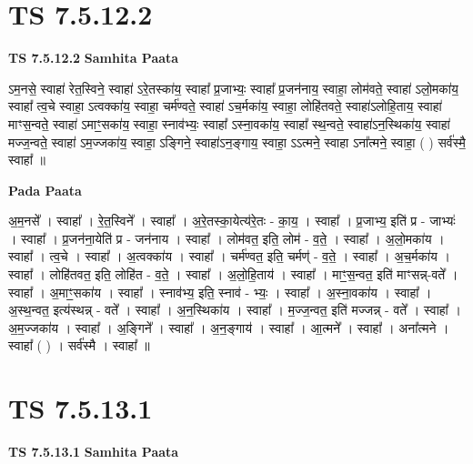 \documentclass[17pt]{extarticle}
\begin{document}
\section*{ TS 7.5.12.2 }

\textbf{TS 7.5.12.2 } \newline
\textbf{Samhita Paata} \newline

ऽम॒नसे॒ स्वाहा॑ रेत॒स्विने॒ स्वाहा॑ ऽरे॒तस्का॑य॒ स्वाहा᳚ प्र॒जाभ्यः॒ स्वाहा᳚ प्र॒जन॑नाय॒ स्वाहा॒ लोम॑वते॒ स्वाहा॑ ऽलो॒मका॑य॒ स्वाहा᳚ त्व॒चे स्वाहा॒ ऽत्वक्का॑य॒ स्वाहा॒ चर्म॑ण्वते॒ स्वाहा॑ ऽच॒र्मका॑य॒ स्वाहा॒ लोहि॑तवते॒ स्वाहा॑ऽलोहि॒ताय॒ स्वाहा॑ माꣳस॒न्वते॒ स्वाहा॑ ऽमाꣳ॒॒सका॑य॒ स्वाहा॒ स्नाव॑भ्यः॒ स्वाहा᳚ ऽस्ना॒वका॑य॒ स्वाहा᳚ स्थ॒न्वते॒ स्वाहा॑ऽन॒स्थिका॑य॒ स्वाहा॑ मज्ज॒न्वते॒ स्वाहा॑ ऽम॒ज्जका॑य॒ स्वाहा॒ ऽङ्गिने॒ स्वाहा॑ऽन॒ङ्गाय॒ स्वाहा॒ ऽऽत्मने॒ स्वाहा ऽना᳚त्मने॒ स्वाहा॒ ( ) सर्व॑स्मै॒ स्वाहा᳚ ॥ \newline

\textbf{Pada Paata} \newline

अ॒म॒नसे᳚ । स्वाहा᳚ । रे॒त॒स्विने᳚ । स्वाहा᳚ । अ॒रे॒तस्का॒येत्य॑रे॒तः - का॒य॒ । स्वाहा᳚ । प्र॒जाभ्य॒ इति॑ प्र - जाभ्यः॑ । स्वाहा᳚ । प्र॒जन॑ना॒येति॑ प्र - जन॑नाय । स्वाहा᳚ । लोम॑वत॒ इति॒ लोम॑ - व॒ते॒ । स्वाहा᳚ । अ॒लो॒मका॑य । स्वाहा᳚ । त्व॒चे । स्वाहा᳚ । अ॒त्वक्का॑य । स्वाहा᳚ । चर्म॑ण्वत॒ इति॒ चर्मण्॑ -   व॒ते॒ । स्वाहा᳚ । अ॒च॒र्मका॑य । स्वाहा᳚ । लोहि॑तवत॒ इति॒ लोहि॑त - व॒ते॒ । स्वाहा᳚ । अ॒लो॒हि॒ताय॑ । स्वाहा᳚ । माꣳ॒॒स॒न्वत॒ इति॑ माꣳसन्न्-वते᳚ । स्वाहा᳚ । अ॒माꣳ॒॒सका॑य । स्वाहा᳚ । स्नाव॑भ्य॒ इति॒ स्नाव॑ - भ्यः॒ । स्वाहा᳚ । अ॒स्ना॒वका॑य । स्वाहा᳚ । अ॒स्थ॒न्वत॒ इत्य॑स्थन्न् - वते᳚ । स्वाहा᳚ । अ॒न॒स्थिका॑य । स्वाहा᳚ । म॒ज्ज॒न्वत॒ इति॑ मज्जन्न् - वते᳚ । स्वाहा᳚ । अ॒म॒ज्जका॑य । स्वाहा᳚ । अ॒ङ्गिने᳚ । स्वाहा᳚ । अ॒न॒ङ्गाय॑ । स्वाहा᳚ । आ॒त्मने᳚ । स्वाहा᳚ । अना᳚त्मने । स्वाहा᳚ ( ) । सर्व॑स्मै । स्वाहा᳚ ॥  \newline




\section*{ TS 7.5.13.1 }

\textbf{TS 7.5.13.1 } \newline
\textbf{Samhita Paata} \newline
\end{document}
